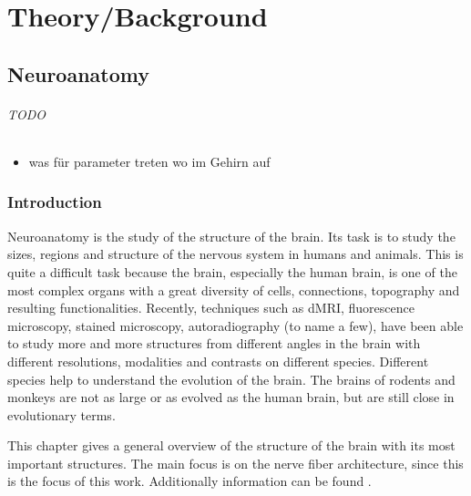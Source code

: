\newpage\null\thispagestyle{empty}\newpage
\clearpage{\thispagestyle{empty}\cleardoublepage}
\part{Theory/Background}
\parttoc
% 
% 
% 
\cleardoublepage
\setcounter{chapter}{1}
\chapter{Neuroanatomy}
\label{chap:neuro}
%
%
%
\paragraph{TODO}
\begin{itemize}
    \item was für parameter treten wo im Gehirn auf
\end{itemize}
%
%
\section{Introduction}
%
Neuroanatomy is the study of the structure of the brain.
Its task is to study the sizes, regions and structure of the nervous system in humans and animals.
This is quite a difficult task because the brain, especially the human brain, is one of the most complex organs with a great diversity of cells, connections, topography and resulting functionalities.
Recently, techniques such as \ac{dMRI}, fluorescence microscopy, stained microscopy, autoradiography (to name a few), have been able to study more and more structures from different angles in the brain with different resolutions, modalities and contrasts on different species.
Different species help to understand the evolution of the brain. The brains of rodents and monkeys are not as large or as evolved as the human brain, but are still close in evolutionary terms.
\par
%
This chapter gives a general overview of the structure of the brain with its most important structures.
The main focus is on the nerve fiber architecture, since this is the focus of this work.
Additionally information can be found \eg{} \dummy{}.
%
%
%
